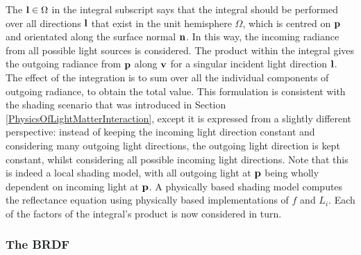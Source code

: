 The \begin{math}\mathbf{l}\in\Omega\end{math} in the integral subscript says that the integral should be performed over all directions \begin{math}\mathbf{l}\end{math} that exist in the unit hemisphere \begin{math}\Omega\end{math}, which is centred on \begin{math}\mathbf{p}\end{math} and orientated along the surface normal \begin{math}\mathbf{n}\end{math}. In this way, the incoming radiance from all possible light sources is considered. The product within the integral gives the outgoing radiance from \begin{math}\mathbf{p}\end{math} along \begin{math}\mathbf{v}\end{math} for a singular incident light direction \begin{math}\mathbf{l}\end{math}. The effect of the integration is to sum over all the individual components of outgoing radiance, to obtain the total value. This formulation is consistent with the shading scenario that was introduced in Section \ref{PhysicsOfLightMatterInteraction}, except it is expressed from a slightly different perspective: instead of keeping the incoming light direction constant and considering many outgoing light directions, the outgoing light direction is kept constant, whilst considering all possible incoming light directions. Note that this is indeed a local shading model, with all outgoing light at \begin{math}\mathbf{p}\end{math} being wholly dependent on incoming light at \begin{math}\mathbf{p}\end{math}. A physically based shading model computes the reflectance equation using physically based implementations of \begin{math}f\end{math} and \begin{math}L_i\end{math}. Each of the factors of the integral's product is now considered in turn.

\subsubsection{The BRDF}

